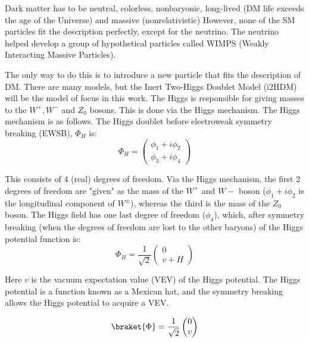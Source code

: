 \documentclass[12pt]{article}
\begin{document}
Dark matter has to be neutral, colorless, nonbaryonic, long-lived (DM life exceeds the age of the Universe) and massive (nonrelativistic) %
However, none of the SM particles fit the description perfectly, except for the neutrino. The neutrino helped develop a group of hypothetical particles called WIMPS (Weakly Interacting Massive Particles).

The only way to do this is to introduce a new particle that fits the description of DM. There are many models, but the Inert Two-Higgs Doublet Model (i2HDM) will be the model of focus in this work. The Higgs is responsible for giving masses to the $W^+, W^-$ and $Z_0$ bosons. This is done via the Higgs mechanism. The Higgs mechanism is as follows.
The Higgs doublet before electroweak symmetry breaking (EWSB), $\Phi_H$ is:
\begin{equation}
    \Phi_H =
    \begin{pmatrix}
        {\phi_1 + i\phi_2} \\
        {\phi_3 + i\phi_4}
    \end{pmatrix}
\end{equation}

% 

This consists of 4 (real) degrees of freedom. Via the Higgs mechanism, the first 2 degrees of freedom are "given" as the mass of the $W^+$ and $W-$ boson ($\phi_1 + i\phi_2$ is the longitudinal component of $W^\pm$), whereas the third is the mass of the $Z_0$ boson. The Higgs field has one last degree of freedom ($\phi_4$), which, after symmetry breaking (when the degrees of freedom are lost to the other baryons) of the Higgs potential function is: 
\begin{equation}
    \Phi_H = \frac{1}{\sqrt{2}}
    \begin{pmatrix}
        {0} \\
        {v + H}
    \end{pmatrix}
\end{equation}

Here $v$ is the vacuum expectation value (VEV) of the Higgs potential. The Higgs potential is a function known as a Mexican hat, and the symmetry breaking allows the Higgs potential to acquire a VEV.

\begin{equation}
    \braket{\Phi} = \frac{1}{\sqrt{2}}
    \begin{pmatrix}
        0\\
        v
    \end{pmatrix}
\end{equation}
\end{document}
